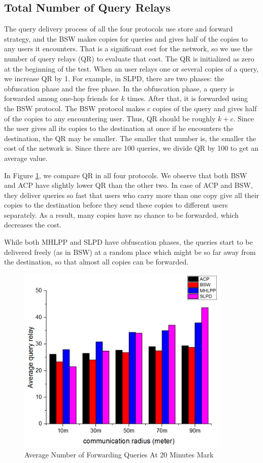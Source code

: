\subsection{ Total Number of Query Relays}

\noindent The query delivery process of all the four protocols use store and forward strategy, and the BSW makes copies for queries and gives half of the copies to any users it encounters. That is a significant cost for the network, so we use the number of query relays (QR) to evaluate that cost. The QR is initialized as zero at the beginning of the test. When an user relays one or several copies of a query, we increase QR by 1. For example, in SLPD, there are two phases: the obfuscation phase and the free phase. In the obfuscation phase, a query is forwarded among one-hop friends for $k$ times. After that, it is forwarded using the BSW protocol. The BSW protocol makes $c$ copies of the query and gives half of the copies to any encountering user. Thus, QR should be roughly $k+c$. Since the user gives all its copies to the destination at once if he encounters the destination, the QR may be smaller. The smaller that number is, the smaller the cost of the network is. Since there are 100 queries, we divide QR by 100 to get an average value. 

In Figure \ref{fig:F418AverageTotalNumberofForwardingQueriesAt20Minutes}, we compare QR in all four protocols. We observe that both BSW and ACP have slightly lower QR than the other two. In case of ACP and BSW, they deliver queries so fast that users who carry more than one copy give all their copies to the destination before they send these copies to different users separately. As a result, many copies have no chance to be forwarded, which decreases the cost. 

While both MHLPP and SLPD have obfuscation phases, the queries start to be delivered freely (as in BSW) at a random place which might be so far away from the destination, so that almost all copies can be forwarded.

\begin{figure} [hbtp]
\centering 
\includegraphics[width=4.0in]{figures/F418AverageTotalNumberofForwardingQueriesAt20Minutes.png}
\caption{Average Number of Forwarding Queries At 20 Minutes Mark} 
\label{fig:F418AverageTotalNumberofForwardingQueriesAt20Minutes} %
\end{figure}

